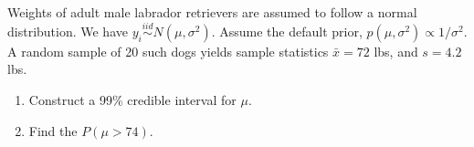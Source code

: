   \item 
 Weights of adult male labrador retrievers are assumed to follow a normal distribution. We have $y_i\stackrel{iid}{\sim}N(\mu, \sigma^2)$. Assume the default prior, $p(\mu, \sigma^2)\propto 1/\sigma^2$. A random sample of 20 such dogs yields sample statistics $\bar{x}=72$ lbs, and $s=4.2$ lbs. 
 
     
    \begin{enumerate}
      \item Construct a 99\% credible interval for $\mu$. 
      \item Find the $P(\mu>74)$. 
\end{enumerate}

